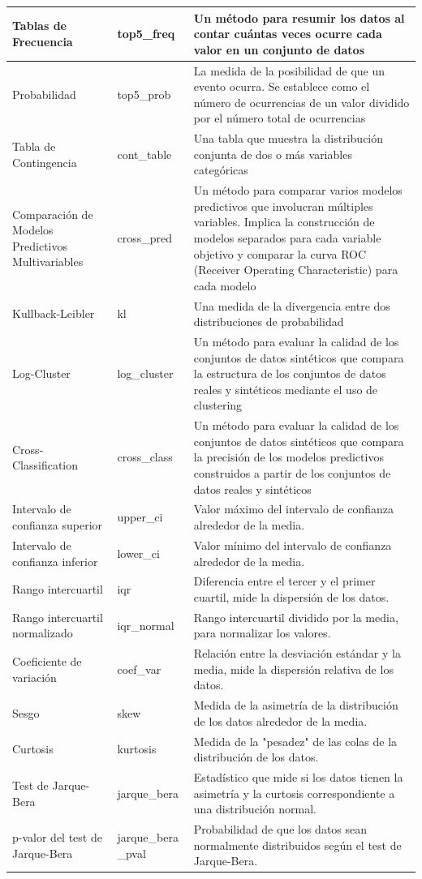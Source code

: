 \begin{longtable}{|m{7em}|m{5em}|m{20em}|}
    \hline
    Tablas de Frecuencia & top5\_freq & Un método para resumir los datos al contar cuántas veces ocurre cada valor en un conjunto de datos \\
    \hline
    Probabilidad & top5\_prob & La medida de la posibilidad de que un evento ocurra. Se establece como el número de ocurrencias de un valor dividido por el número total de ocurrencias \\
    \hline
    Tabla de Contingencia & cont\_table & Una tabla que muestra la distribución conjunta de dos o más variables categóricas \\
    \hline
    Comparación de Modelos Predictivos Multivariables & cross\_pred & Un método para comparar varios modelos predictivos que involucran múltiples variables. Implica la construcción de modelos separados para cada variable objetivo y comparar la curva ROC (Receiver Operating Characteristic) para cada modelo \\
    \hline
    Kullback-Leibler & kl & Una medida de la divergencia entre dos distribuciones de probabilidad \\
    \hline
    Log-Cluster & log\_cluster & Un método para evaluar la calidad de los conjuntos de datos sintéticos que compara la estructura de los conjuntos de datos reales y sintéticos mediante el uso de clustering \\
    \hline
    Cross-Classification & cross\_class & Un método para evaluar la calidad de los conjuntos de datos sintéticos que compara la precisión de los modelos predictivos construidos a partir de los conjuntos de datos reales y sintéticos \\
    \hline
    Intervalo de confianza superior & upper\_ci & Valor máximo del intervalo de confianza alrededor de la media. \\
    \hline
    Intervalo de confianza inferior & lower\_ci & Valor mínimo del intervalo de confianza alrededor de la media. \\
    \hline
    Rango intercuartil & iqr & Diferencia entre el tercer y el primer cuartil, mide la dispersión de los datos. \\
    \hline
    Rango intercuartil normalizado & iqr\_normal & Rango intercuartil dividido por la media, para normalizar los valores. \\
    \hline
    Coeficiente de variación & coef\_var & Relación entre la desviación estándar y la media, mide la dispersión relativa de los datos. \\
    \hline
    Sesgo & skew & Medida de la asimetría de la distribución de los datos alrededor de la media. \\
    \hline
    Curtosis & kurtosis & Medida de la "pesadez" de las colas de la distribución de los datos. \\
    \hline
    Test de Jarque-Bera & jarque\_bera & Estadístico que mide si los datos tienen la asimetría y la curtosis correspondiente a una distribución normal. \\
    \hline
    p-valor del test de Jarque-Bera & jarque\_bera \_pval & Probabilidad de que los datos sean normalmente distribuidos según el test de Jarque-Bera. \\
    \hline

\end{longtable}
